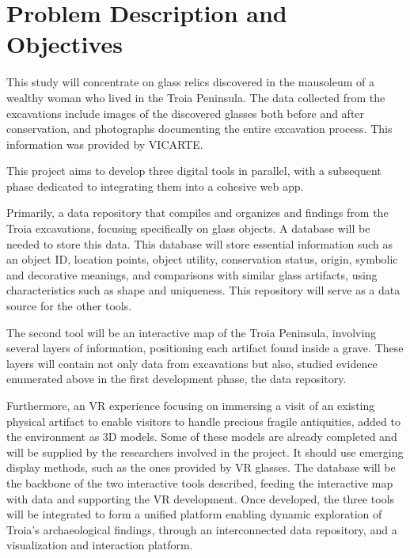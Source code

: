 \section{Problem Description and Objectives}
\label{sec:problem_description_and_objectives} 
This study will concentrate on glass relics discovered in the mausoleum of a wealthy woman who lived in the Troia Peninsula. The data collected from the excavations include 
images of the discovered glasses both before and after conservation, and photographs documenting the entire excavation process. 
This information was provided by \gls{VICARTE}.

This project aims to develop three digital tools in parallel, with a subsequent phase dedicated to 
integrating them into a cohesive web app.


Primarily, a data repository that compiles and organizes and findings from 
the Troia excavations, focusing specifically on glass objects. A database will be needed to store this data. 
This database will store essential information such as an object ID, location points, object utility,
conservation status, origin, symbolic and decorative meanings, and comparisons with similar glass artifacts, using characteristics such as shape and uniqueness. 
This repository will serve as a data source for the other tools.


The second tool will be an interactive map of the Troia Peninsula, involving several layers of information, positioning each 
artifact found inside a grave. These layers will contain not only data from excavations but also, 
studied evidence enumerated above in the first development phase, the data repository.
 
Furthermore, an \gls{VR} experience focusing on immersing a visit of an existing physical 
artifact to enable visitors to handle precious fragile antiquities, added to the environment as \gls{3D} models. Some of these models are already completed and will be supplied by the researchers involved in the project.
It should use emerging display methods, such as the ones provided by \gls{VR} glasses.
The database will be the backbone of the two interactive tools described, feeding the interactive map with data and supporting the \gls{VR} development.
Once developed, the three tools will be integrated to form a unified platform enabling dynamic exploration of Troia's archaeological findings,
through an interconnected data repository, and a visualization and interaction platform.

